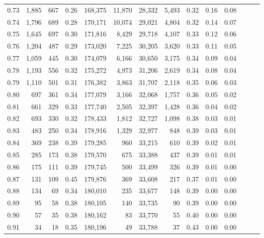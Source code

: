 \begin{tabular}{rrrrrrrrrrrrrr}
0.73 &  1,885 &  667 &  0.26 &  168,375 &   11,870 &  28,332 &   5,493 &  0.32 &  0.16 &      0.08 \\
0.74 &  1,796 &  689 &  0.28 &  170,171 &   10,074 &  29,021 &   4,804 &  0.32 &  0.14 &      0.07 \\
0.75 &  1,645 &  697 &  0.30 &  171,816 &    8,429 &  29,718 &   4,107 &  0.33 &  0.12 &      0.06 \\
0.76 &  1,204 &  487 &  0.29 &  173,020 &    7,225 &  30,205 &   3,620 &  0.33 &  0.11 &      0.05 \\
0.77 &  1,059 &  445 &  0.30 &  174,079 &    6,166 &  30,650 &   3,175 &  0.34 &  0.09 &      0.04 \\
0.78 &  1,193 &  556 &  0.32 &  175,272 &    4,973 &  31,206 &   2,619 &  0.34 &  0.08 &      0.04 \\
0.79 &  1,110 &  501 &  0.31 &  176,382 &    3,863 &  31,707 &   2,118 &  0.35 &  0.06 &      0.03 \\
0.80 &    697 &  361 &  0.34 &  177,079 &    3,166 &  32,068 &   1,757 &  0.36 &  0.05 &      0.02 \\
0.81 &    661 &  329 &  0.33 &  177,740 &    2,505 &  32,397 &   1,428 &  0.36 &  0.04 &      0.02 \\
0.82 &    693 &  330 &  0.32 &  178,433 &    1,812 &  32,727 &   1,098 &  0.38 &  0.03 &      0.01 \\
0.83 &    483 &  250 &  0.34 &  178,916 &    1,329 &  32,977 &     848 &  0.39 &  0.03 &      0.01 \\
0.84 &    369 &  238 &  0.39 &  179,285 &      960 &  33,215 &     610 &  0.39 &  0.02 &      0.01 \\
0.85 &    285 &  173 &  0.38 &  179,570 &      675 &  33,388 &     437 &  0.39 &  0.01 &      0.01 \\
0.86 &    175 &  111 &  0.39 &  179,745 &      500 &  33,499 &     326 &  0.39 &  0.01 &      0.00 \\
0.87 &    131 &  109 &  0.45 &  179,876 &      369 &  33,608 &     217 &  0.37 &  0.01 &      0.00 \\
0.88 &    134 &   69 &  0.34 &  180,010 &      235 &  33,677 &     148 &  0.39 &  0.00 &      0.00 \\
0.89 &     95 &   58 &  0.38 &  180,105 &      140 &  33,735 &      90 &  0.39 &  0.00 &      0.00 \\
0.90 &     57 &   35 &  0.38 &  180,162 &       83 &  33,770 &      55 &  0.40 &  0.00 &      0.00 \\
0.91 &     34 &   18 &  0.35 &  180,196 &       49 &  33,788 &      37 &  0.43 &  0.00 &      0.00 \\

\end{tabular}
